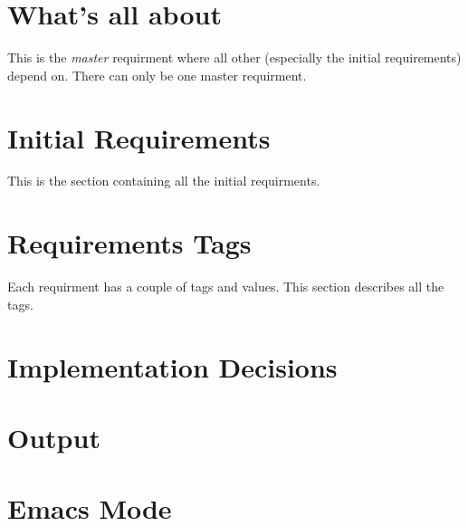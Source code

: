 \documentclass{article}
\begin{document}
\section{What's all about}
This is the \textsl{master} requirment where all other (especially the
initial requirements) depend on. There can only be one master requirment.


\section{Initial Requirements}
This is the section containing all the initial requirments.









\section{Requirements Tags}
Each requirment has a couple of tags and values.  This section
describes all the tags.













\section{Implementation Decisions}




\section{Output}






\section{Emacs Mode}






\end{document}
